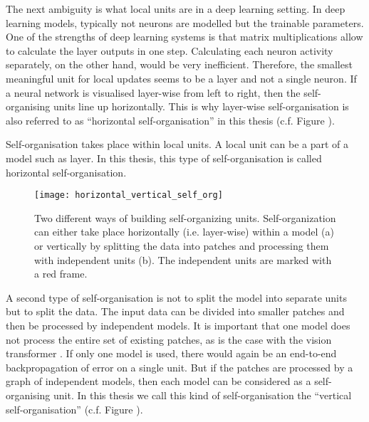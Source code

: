 The next ambiguity is what local units are in a deep learning setting.
In deep learning models, typically not neurons are modelled but the trainable parameters.
One of the strengths of deep learning systems is that matrix multiplications allow to calculate the layer outputs in one step.
Calculating each neuron activity separately, on the other hand, would be very inefficient.
Therefore, the smallest meaningful unit for local updates seems to be a layer and not a single neuron.
If a neural network is visualised layer-wise from left to right, then the self-organising units line up horizontally. This is why layer-wise self-organisation is also referred to as ``horizontal self-organisation'' in this thesis (c.f. Figure ).

\begin{implementation}
	Self-organisation takes place within local units. A local unit can be a part of a model such as layer.
	In this thesis, this type of self-organisation is called horizontal self-organisation.
\end{implementation}

\begin{figure}[h]
    \centering
    \texttt{[image: horizontal\_vertical\_self\_org]}
    \caption[Overview of horizontal and vertical self-organization]{Two different ways of building self-organizing units. Self-organization can either take place horizontally (i.e. layer-wise) within a model (a) or vertically by splitting the data into patches and processing them with independent units (b). The independent units are marked with a red frame.}
\end{figure}
 
A second type of self-organisation is not to split the model into separate units but to split the data.
The input data can be divided into smaller patches and then be processed by independent models.
It is important that one model does not process the entire set of existing patches, as is the case with the vision transformer . If only one model is used, there would again be an end-to-end backpropagation of error on a single unit.
But if the patches are processed by a graph of independent models, then each model can be considered as a self-organising unit.
In this thesis we call this kind of self-organisation the ``vertical self-organisation'' (c.f. Figure ).

